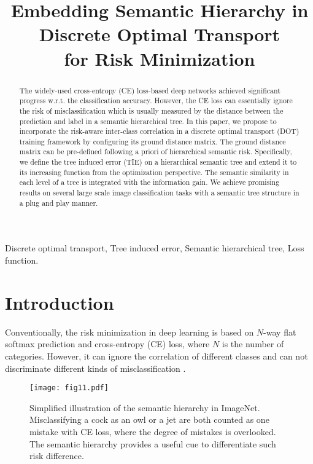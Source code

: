 \documentclass{article}
\title{Embedding Semantic Hierarchy in Discrete Optimal Transport\\ for Risk Minimization}
\theoremstyle{plain}%
\begin{document}
%
\maketitle
%
\begin{abstract}
The widely-used cross-entropy (CE) loss-based deep networks achieved significant progress w.r.t. the classification accuracy. However, the CE loss can essentially ignore the risk of misclassification which is usually measured by the distance between the prediction and label in a semantic hierarchical tree. In this paper, we propose to incorporate the risk-aware inter-class correlation in a discrete optimal transport (DOT) training framework by configuring its ground distance matrix. The ground distance matrix can be pre-defined following a priori of hierarchical semantic risk. Specifically, we define the tree induced error (TIE) on a hierarchical semantic tree and extend it to its increasing function from the optimization perspective. The semantic similarity in each level of a tree is integrated with the information gain. We achieve promising results on several large scale image classification tasks with a semantic tree structure in a plug and play manner.
\end{abstract}
%
\begin{keywords}
Discrete optimal transport, Tree induced error, Semantic hierarchical tree, Loss function.
\end{keywords}
%
\section{Introduction} 


Conventionally, the risk minimization in deep learning is based on $N$-way flat softmax prediction and cross-entropy (CE) loss, where $N$ is the number of categories. However, it can ignore the correlation of different classes and can not discriminate different kinds of misclassification \cite{liu2018ordinal,liu2020unimodal}. 


\begin{figure}[t]
\centering
\texttt{[image: fig11.pdf]} 
\caption{Simplified illustration of the semantic hierarchy in ImageNet. Misclassifying a cock as an owl or a jet are both counted as one mistake with CE loss, where the degree of mistakes is overlooked. The semantic hierarchy provides a useful cue to differentiate such risk difference.} 
\label{fig:1}
\end{figure} 
\end{document}
